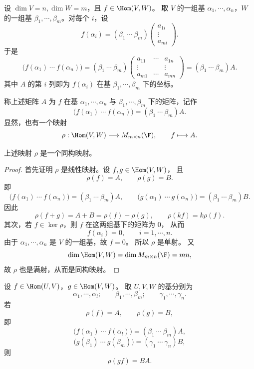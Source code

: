 设 $\dim V=n,\dim W=m$，且 $f\in\Hom(V,W)$。
取 $V$ 的一组基 $\alpha_1,\cdots,\alpha_n$，$W$ 的一组基
$\beta_1,\cdots,\beta_m$。对每个 $i$，设
\[
f(\alpha_i)=
(\beta_1\ \cdots\ \beta_m)
\begin{pmatrix}
	a_{1i}\\
	\vdots\\
	a_{mi}
\end{pmatrix}.
\]
于是
\[
\bigl(f(\alpha_1)\ \cdots\ f(\alpha_n)\bigr)
=
(\beta_1\ \cdots\ \beta_m)
\begin{pmatrix}
	a_{11}&\cdots&a_{1n}\\
	\vdots& &\vdots\\
	a_{m1}&\cdots&a_{mn}
\end{pmatrix}
=(\beta_1\ \cdots\ \beta_m)A.
\]
其中 $A$ 的第 $i$ 列即为 $f(\alpha_i)$ 在基
$\beta_1,\cdots,\beta_m$ 下的坐标。

\begin{definition}\label{p1:concept:c4-l2360}
	称上述矩阵 $A$ 为 $f$ 在基 $\alpha_1,\cdots,\alpha_n$
	与 $\beta_1,\cdots,\beta_m$ 下的矩阵，记作
	\[
	\bigl(f(\alpha_1)\ \cdots\ f(\alpha_n)\bigr)
	=(\beta_1\ \cdots\ \beta_m)A.
	\]
	显然，也有一个映射
	\[
	\rho:\Hom(V,W)\longrightarrow M_{m\times n}(\F),
	\qquad
	f\longmapsto A.
	\]
\end{definition}

\begin{lemma}
	上述映射 $\rho$ 是一个同构映射。
\end{lemma}

\begin{proof}
	首先证明 $\rho$ 是线性映射。设 $f,g\in\Hom(V,W)$，
	且
	\[
	\rho(f)=A,
	\qquad
	\rho(g)=B.
	\]
	即
	\[
	\bigl(f(\alpha_1)\ \cdots\ f(\alpha_n)\bigr)
	=(\beta_1\ \cdots\ \beta_m)A,
	\qquad
	\bigl(g(\alpha_1)\ \cdots\ g(\alpha_n)\bigr)
	=(\beta_1\ \cdots\ \beta_m)B.
	\]
	因此
	\[
	\rho(f+g)=A+B=\rho(f)+\rho(g),
	\qquad
	\rho(kf)=k\rho(f).
	\]
	其次，若 $f\in\ker\rho$，则 $f$ 在这两组基下的矩阵为 $0$，
	从而
	\[
	f(\alpha_i)=0,
	\qquad i=1,\cdots,n.
	\]
	由于 $\alpha_1,\cdots,\alpha_n$ 是 $V$ 的一组基，故 $f=0$。
	所以 $\rho$ 是单射。
	又
	\[
	\dim\Hom(V,W)=\dim M_{m\times n}(\F)=mn,
	\]
	故 $\rho$ 也是满射，从而是同构映射。
\end{proof}

\begin{lemma}
	设 $f\in\Hom(U,V)$，$g\in\Hom(V,W)$。
	取 $U,V,W$ 的基分别为
	\[
	\alpha_1,\cdots,\alpha_l;
	\qquad
	\beta_1,\cdots,\beta_m;
	\qquad
	\gamma_1,\cdots,\gamma_n.
	\]
	若
	\[
	\rho(f)=A,
	\qquad
	\rho(g)=B,
	\]
	即
	\[
	\bigl(f(\alpha_1)\ \cdots\ f(\alpha_l)\bigr)
	=(\beta_1\ \cdots\ \beta_m)A,
	\]
	\[
	\bigl(g(\beta_1)\ \cdots\ g(\beta_m)\bigr)
	=(\gamma_1\ \cdots\ \gamma_n)B,
	\]
	则
	\[
	\rho(gf)=BA.
	\]
\end{lemma}

